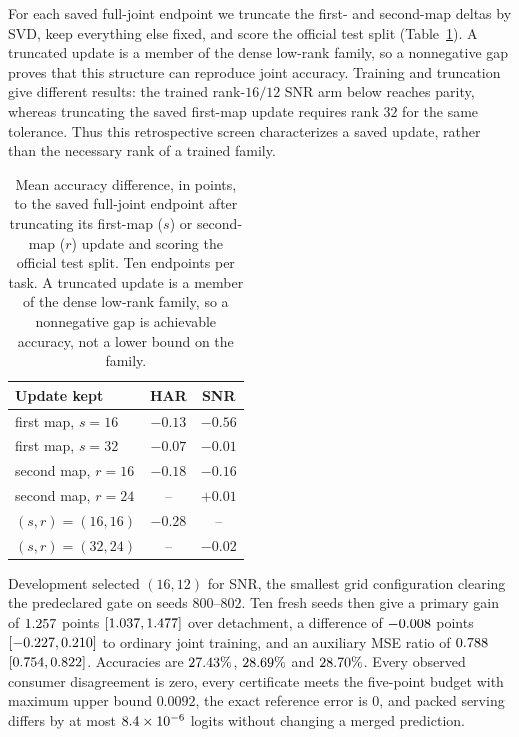 For each
saved full-joint endpoint we truncate the first- and second-map deltas by SVD,
keep everything else fixed, and score the official test split
(Table~\ref{tab:rank}). A truncated update is a member of the dense low-rank
family, so a nonnegative gap proves that this structure can reproduce joint
accuracy. Training and truncation give different results: the trained rank-$16/12$
SNR arm below reaches parity, whereas truncating the saved first-map update
requires rank $32$ for the same tolerance. Thus this retrospective screen
characterizes a saved update, rather than the necessary rank of a trained family.

\begin{table}[h]
\centering
\small
\caption{Mean accuracy difference, in points, to the saved full-joint endpoint
after truncating its first-map ($s$) or second-map ($r$) update and scoring the
official test split. Ten endpoints per task. A truncated update is a member of
the dense low-rank family, so a nonnegative gap is achievable accuracy, not a
lower bound on the family.}
\label{tab:rank}
\begin{tabular}{lcc}
\toprule
Update kept & HAR & SNR\\
\midrule
first map, $s=16$ & $-0.13$ & $-0.56$\\
first map, $s=32$ & $-0.07$ & $-0.01$\\
second map, $r=16$ & $-0.18$ & $-0.16$\\
second map, $r=24$ & -- & $+0.01$\\
$(s,r)=(16,16)$ & $-0.28$ & --\\
$(s,r)=(32,24)$ & -- & $-0.02$\\
\bottomrule
\end{tabular}
\end{table}

Development selected $(16,12)$ for SNR, the smallest grid configuration clearing
the predeclared gate on seeds $800$--$802$. Ten fresh seeds then give a primary
gain of $1.257$ points $[1.037,1.477]$ over
detachment, a difference of $-0.008$ points
$[-0.227,0.210]$ to ordinary joint training, and an
auxiliary MSE ratio of $0.788$
$[0.754,0.822]$. Accuracies are $27.43\%$,
$28.69\%$ and $28.70\%$. Every observed consumer
disagreement is zero, every certificate meets the five-point budget with maximum
upper bound $0.0092$, the exact reference error is $0$, and packed serving
differs by at most $8.4\times10^{-6}$ logits without changing a merged
prediction.

